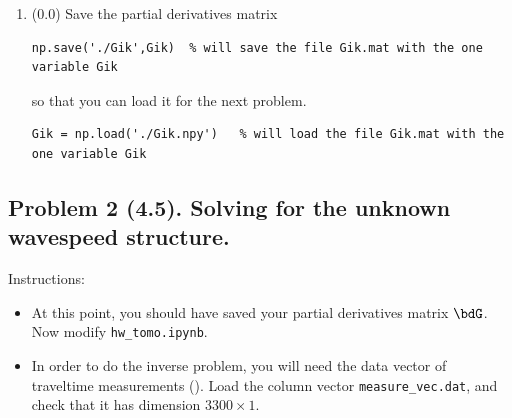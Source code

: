 \documentclass[11pt,titlepage,fleqn]{article}
\newcommand{\tfiletomo}{{\tt hw\_tomo.ipynb}}
\begin{document}
\begin{enumerate}

\item (0.0) Save the partial derivatives matrix
%
\begin{verbatim}
np.save('./Gik',Gik)  % will save the file Gik.mat with the one variable Gik
\end{verbatim}
%
so that you can load it for the next problem.
%
\begin{verbatim}
Gik = np.load('./Gik.npy')   % will load the file Gik.mat with the one variable Gik
\end{verbatim}

\end{enumerate}


\pagebreak
\subsection*{Problem 2 (4.5). Solving for the unknown wavespeed structure.}

Instructions:
%
\begin{itemize}
\item At this point, you should have saved your partial derivatives matrix $\bdG$. \\ Now modify \tfiletomo.

\item In order to do the inverse problem, you will need the data vector of traveltime measurements (). Load the column vector \verb+measure_vec.dat+, and check that it has dimension \mbox{$3300 \times 1$}.

\end{itemize}
\end{document}
